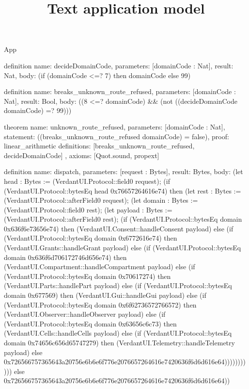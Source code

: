 \begin{lexlean}{App}
\title{Text application model}
\begin{semanticmodule}
definition{
  name: decideDomainCode,
  parameters: [domainCode : Nat],
  result: Nat,
  body: (if (domainCode <=? 7) then domainCode else 99)
}

definition{
  name: breaks_unknown_route_refused,
  parameters: [domainCode : Nat],
  result: Bool,
  body: ((8 <=? domainCode) && (not ((decideDomainCode domainCode) =? 99)))
}

theorem{
  name: unknown_route_refused,
  parameters: [domainCode : Nat],
  statement: ((breaks_unknown_route_refused domainCode) = false),
  proof: linear_arithmetic{
    definitions: [breaks_unknown_route_refused, decideDomainCode]
  },
  axioms: [Quot.sound, propext]
}

definition{
  name: dispatch,
  parameters: [request : Bytes],
  result: Bytes,
  body: (let head : Bytes := (VerdantUI.Protocol::field0 request);
    (if (VerdantUI.Protocol::bytesEq head 0x76657264616e74) then
      (let rest : Bytes := (VerdantUI.Protocol::afterField0 request);
      (let domain : Bytes := (VerdantUI.Protocol::field0 rest);
      (let payload : Bytes := (VerdantUI.Protocol::afterField0 rest);
      (if (VerdantUI.Protocol::bytesEq domain 0x636f6e73656e74) then (VerdantUI.Consent::handleConsent payload) else
      (if (VerdantUI.Protocol::bytesEq domain 0x6772616e74) then (VerdantUI.Grants::handleGrant payload) else
      (if (VerdantUI.Protocol::bytesEq domain 0x636f6d706172746d656e74) then (VerdantUI.Compartment::handleCompartment payload) else
      (if (VerdantUI.Protocol::bytesEq domain 0x70617274) then (VerdantUI.Parts::handlePart payload) else
      (if (VerdantUI.Protocol::bytesEq domain 0x677569) then (VerdantUI.Gui::handleGui payload) else
      (if (VerdantUI.Protocol::bytesEq domain 0x6f62736572766572) then (VerdantUI.Observer::handleObserver payload) else
      (if (VerdantUI.Protocol::bytesEq domain 0x63656c6c73) then (VerdantUI.Cells::handleCells payload) else
      (if (VerdantUI.Protocol::bytesEq domain 0x74656c656d65747279) then (VerdantUI.Telemetry::handleTelemetry payload) else
      0x726566757365643a20756e6b6e6f776e2076657264616e7420636f6d6d616e64)))))))))))
    else 0x726566757365643a20756e6b6e6f776e2076657264616e7420636f6d6d616e64))
}


\end{semanticmodule}
\end{lexlean}
